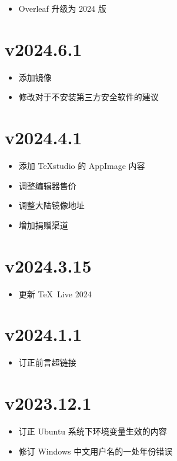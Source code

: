 \begin{itemize}
  \item Overleaf 升级为 2024 版
\end{itemize}

\section*{v2024.6.1}

\begin{itemize}
  \item 添加镜像
  \item 修改对于不安装第三方安全软件的建议
\end{itemize}

\section*{v2024.4.1}

\begin{itemize}
  \item 添加 \TeX studio 的 AppImage 内容
  \item 调整编辑器售价
  \item 调整大陆镜像地址
  \item 增加捐赠渠道
\end{itemize}

\section*{v2024.3.15}

\begin{itemize}
  \item 更新 \TeX~Live 2024
\end{itemize}

\section*{v2024.1.1}

\begin{itemize}
  \item 订正前言超链接
\end{itemize}

\section*{v2023.12.1}

\begin{itemize}
  \item 订正 Ubuntu 系统下环境变量生效的内容
  \item 修订 Windows 中文用户名的一处年份错误
\end{itemize}


